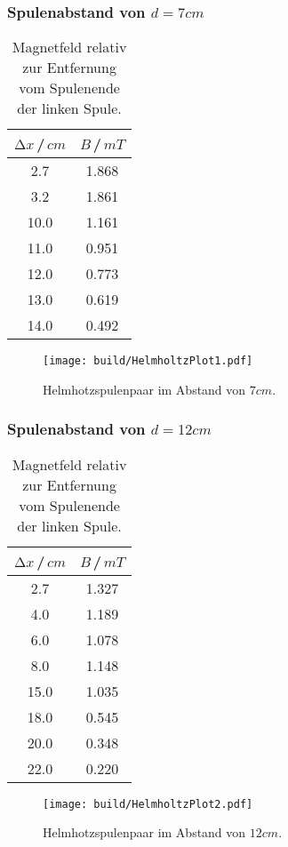     \subsubsection{Spulenabstand von $d=7\unit{cm}$}
    
    \begin{table}[H]
        \centering
        \begin{tabular}{c c}
            \toprule
            $\increment x$\,/\,$\unit{cm}$& $B$\,/\,$\unit{mT}$\\
            \midrule
            2.7   &  1.868\\
            3.2   &  1.861\\
            10.0  &  1.161\\
            11.0  &  0.951\\
            12.0  &  0.773\\
            13.0  &  0.619\\
            14.0  &  0.492\\
            \bottomrule
        \end{tabular}
        \caption{Magnetfeld relativ zur Entfernung vom Spulenende der linken Spule.}
        \label{tab:HelmTab7}
    \end{table}
    \begin{figure}[H]
        \centering
        \texttt{[image: build/HelmholtzPlot1.pdf]}
        \caption{Helmhotzspulenpaar im Abstand von $7\unit{cm}$.}
        \label{fig:HelmholtzPlot1}
    \end{figure}
    \subsubsection{Spulenabstand von $d=12\unit{cm}$}

    \begin{table}[H]
        \centering
        \begin{tabular}{c c}
            \toprule
            $\increment x$\,/\,$\unit{cm}$& $B$\,/\,$\unit{mT}$\\
            \midrule
            2.7   &  1.327\\
            4.0   &  1.189\\
            6.0   &  1.078\\
            8.0   &  1.148\\
            15.0  &  1.035\\
            18.0  &  0.545\\
            20.0  &  0.348\\
            22.0  &  0.220\\
            \bottomrule
        \end{tabular}
        \caption{Magnetfeld relativ zur Entfernung vom Spulenende der linken Spule.}
        \label{tab:HelmTab12}
    \end{table}
    \begin{figure}[H]
        \centering
        \texttt{[image: build/HelmholtzPlot2.pdf]}
        \caption{Helmhotzspulenpaar im Abstand von $12\unit{cm}$.}
        \label{fig:HelmholtzPlot2}
    \end{figure}
